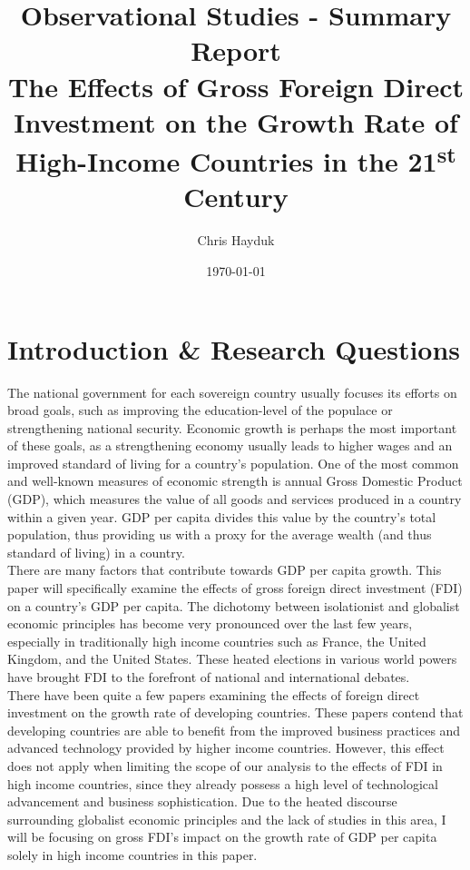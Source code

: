 \documentclass{article}
\title{Observational Studies - Summary Report\\The Effects of Gross Foreign Direct Investment on the Growth Rate of High-Income Countries in the 21\textsuperscript{st} Century}
\author{Chris Hayduk}
\date{\today}
\begin{document}

\doublespacing

\maketitle

\section{Introduction \& Research Questions}
\quad The national government for each sovereign country usually focuses its efforts on broad goals, such as improving the education-level of the populace or strengthening national security. Economic growth is perhaps the most important of these goals, as a strengthening economy usually leads to higher wages and an improved standard of living for a country's population. One of the most common and well-known measures of economic strength is annual Gross Domestic Product (GDP), which measures the value of all goods and services produced in a country within a given year. GDP per capita divides this value by the country's total population, thus providing us with a proxy for the average wealth (and thus standard of living) in a country.\\
\null\quad There are many factors that contribute towards GDP per capita growth. This paper will specifically examine the effects of gross foreign direct investment (FDI) on a country's GDP per capita. The dichotomy between isolationist and globalist economic principles has become very pronounced over the last few years, especially in traditionally high income countries such as France, the United Kingdom, and the United States. These heated elections in various world powers have brought FDI to the forefront of national and international debates.\\
\null\quad There have been quite a few papers examining the effects of foreign direct investment on the growth rate of developing countries. These papers contend that developing countries are able to benefit from the improved business practices and advanced technology provided by higher income countries. However, this effect does not apply when limiting the scope of our analysis to the effects of FDI in high income countries, since they already possess a high level of technological advancement and business sophistication. Due to the heated discourse surrounding globalist economic principles and the lack of studies in this area, I will be focusing on gross FDI's impact on the growth rate of GDP per capita solely in high income countries in this paper.
\end{document}
